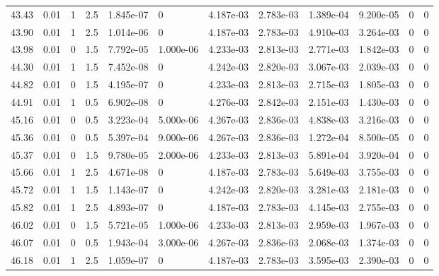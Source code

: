 \documentclass[preview]{standalone}
\begin{document}
{{{{{{\begin{tabular}{L{1.2cm}C{1.2cm} C{0.3cm}C{0.5cm} C{1.4cm}C{1.4cm} C{1.4cm}C{1.4cm} C{1.6cm}C{1.6cm} C{1.6cm}C{1.6cm}}
  43.43  &  0.01  & 1     & 2.5 &  1.845e-07  & 0  &  4.187e-03&   2.783e-03& 1.389e-04 & 9.200e-05   &  0 & 0  \\ 
  43.90  &  0.01  & 1     & 2.5 &  1.014e-06  & 0  &  4.187e-03&   2.783e-03& 4.910e-03 & 3.264e-03   &  0 & 0  \\ 
  43.98  &  0.01  & 0     & 1.5 &  7.792e-05  & 1.000e-06  &  4.233e-03&   2.813e-03& 2.771e-03 & 1.842e-03   &  0 & 0  \\ 
  44.30  &  0.01  & 1     & 1.5 &  7.452e-08  & 0  &  4.242e-03&   2.820e-03& 3.067e-03 & 2.039e-03   &  0 & 0  \\ 
  44.82  &  0.01  & 0     & 1.5 &  4.195e-07  & 0  &  4.233e-03&   2.813e-03& 2.715e-03 & 1.805e-03   &  0 & 0  \\ 
  44.91  &  0.01  & 1     & 0.5 &  6.902e-08  & 0  &  4.276e-03&   2.842e-03& 2.151e-03 & 1.430e-03   &  0 & 0  \\ 
  45.16  &  0.01  & 0     & 0.5 &  3.223e-04  & 5.000e-06  &  4.267e-03&   2.836e-03& 4.838e-03 & 3.216e-03   &  0 & 0  \\ 
  45.36  &  0.01  & 0     & 0.5 &  5.397e-04  & 9.000e-06  &  4.267e-03&   2.836e-03& 1.272e-04 & 8.500e-05   &  0 & 0  \\ 
  45.37  &  0.01  & 0     & 1.5 &  9.780e-05  & 2.000e-06  &  4.233e-03&   2.813e-03& 5.891e-04 & 3.920e-04   &  0 & 0  \\ 
  45.66  &  0.01  & 1     & 2.5 &  4.671e-08  & 0  &  4.187e-03&   2.783e-03& 5.649e-03 & 3.755e-03   &  0 & 0  \\ 
  45.72  &  0.01  & 1     & 1.5 &  1.143e-07  & 0  &  4.242e-03&   2.820e-03& 3.281e-03 & 2.181e-03   &  0 & 0  \\ 
  45.82  &  0.01  & 1     & 2.5 &  4.893e-07  & 0  &  4.187e-03&   2.783e-03& 4.145e-03 & 2.755e-03   &  0 & 0  \\ 
  46.02  &  0.01  & 0     & 1.5 &  5.721e-05  & 1.000e-06  &  4.233e-03&   2.813e-03& 2.959e-03 & 1.967e-03   &  0 & 0  \\ 
  46.07  &  0.01  & 0     & 0.5 &  1.943e-04  & 3.000e-06  &  4.267e-03&   2.836e-03& 2.068e-03 & 1.374e-03   &  0 & 0  \\ 
  46.18  &  0.01  & 1     & 2.5 &  1.059e-07  & 0  &  4.187e-03&   2.783e-03& 3.595e-03 & 2.390e-03   &  0 & 0  \\ 
\hline 
\end{tabular} 

}}}}}}
\end{document}
